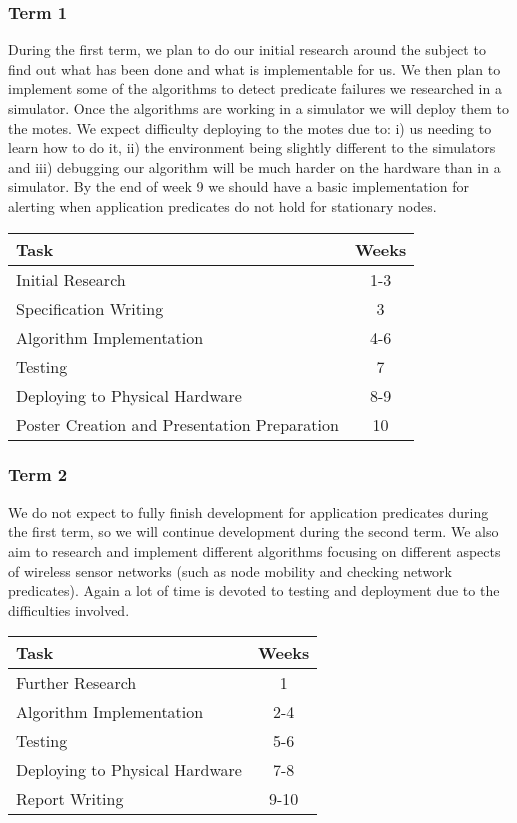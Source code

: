 \documentclass[a4paper]{article}
\begin{document}
\subsubsection{Term 1}

During the first term, we plan to do our initial research around the subject to find out what has been done and what is implementable for us. We then plan to implement some of the algorithms to detect predicate failures we researched in a simulator. Once the algorithms are working in a simulator we will deploy them to the motes. We expect difficulty deploying to the motes due to: i) us needing to learn how to do it, ii) the environment being slightly different to the simulators and iii) debugging our algorithm will be much harder on the hardware than in a simulator. By the end of week 9 we should have a basic implementation for alerting when application predicates do not hold for stationary nodes.

\begin{table}[H]
	\centering
	\begin{tabular}{| l | c |}
	\hline
	\textbf{Task} & \textbf{Weeks}\\
	\hline
	Initial Research & 1-3\\
	\hline
	Specification Writing & 3\\
	\hline
	Algorithm Implementation & 4-6\\
	\hline
	Testing & 7\\
	\hline
	Deploying to Physical Hardware & 8-9\\
	\hline
	Poster Creation and Presentation Preparation & 10\\
	\hline
	\end{tabular}
\end{table}

\subsubsection{Term 2}

We do not expect to fully finish development for application predicates during the first term, so we will continue development during the second term. We also aim to research and implement different algorithms focusing on different aspects of wireless sensor networks (such as node mobility and checking network predicates). Again a lot of time is devoted to testing and deployment due to the difficulties involved.

\begin{table}[H]
	\centering
	\begin{tabular}{| l | c |}
	\hline
	\textbf{Task} & \textbf{Weeks}\\
	\hline
	Further Research & 1\\
	\hline
	Algorithm Implementation & 2-4\\
	\hline
	Testing & 5-6\\
	\hline
	Deploying to Physical Hardware & 7-8\\
	\hline
	Report Writing & 9-10\\
	\hline
	\end{tabular}
\end{table}
\end{document}
